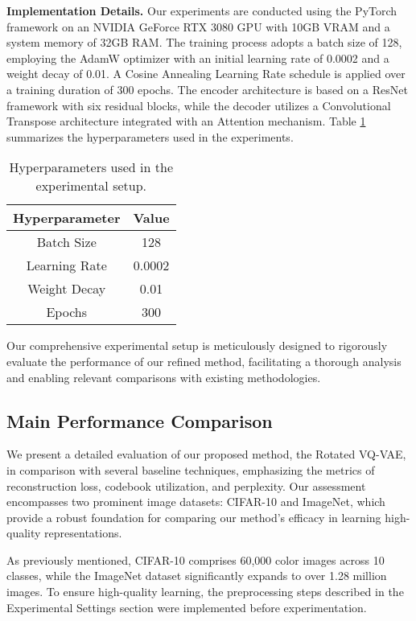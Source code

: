 \textbf{Implementation Details.} Our experiments are conducted using the PyTorch framework on an NVIDIA GeForce RTX 3080 GPU with 10GB VRAM and a system memory of 32GB RAM. The training process adopts a batch size of 128, employing the AdamW optimizer with an initial learning rate of 0.0002 and a weight decay of 0.01. A Cosine Annealing Learning Rate schedule is applied over a training duration of 300 epochs. The encoder architecture is based on a ResNet framework with six residual blocks, while the decoder utilizes a Convolutional Transpose architecture integrated with an Attention mechanism. Table \ref{tab:hyperparameters} summarizes the hyperparameters used in the experiments.

\begin{table}[h]
    \centering
    \begin{tabular}{|c|c|}
        \hline
        Hyperparameter & Value \\
        \hline
        Batch Size & 128 \\
        Learning Rate & 0.0002 \\
        Weight Decay & 0.01 \\
        Epochs & 300 \\
        \hline
    \end{tabular}
    \caption{Hyperparameters used in the experimental setup.}
    \label{tab:hyperparameters}
\end{table}

Our comprehensive experimental setup is meticulously designed to rigorously evaluate the performance of our refined method, facilitating a thorough analysis and enabling relevant comparisons with existing methodologies.

\subsection{Main Performance Comparison} %
We present a detailed evaluation of our proposed method, the Rotated VQ-VAE, in comparison with several baseline techniques, emphasizing the metrics of reconstruction loss, codebook utilization, and perplexity. Our assessment encompasses two prominent image datasets: CIFAR-10 and ImageNet, which provide a robust foundation for comparing our method's efficacy in learning high-quality representations.

As previously mentioned, CIFAR-10 comprises 60,000 color images across 10 classes, while the ImageNet dataset significantly expands to over 1.28 million images. To ensure high-quality learning, the preprocessing steps described in the Experimental Settings section were implemented before experimentation.

